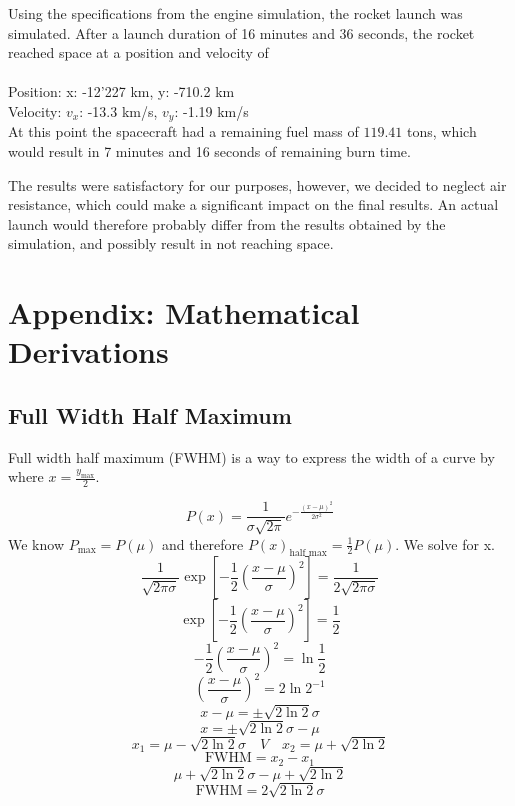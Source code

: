 \documentclass[reprint,english,notitlepage]{revtex4-2}
\begin{document}
Using the specifications from the engine simulation, the rocket launch was simulated.
After a launch duration of 16 minutes and 36 seconds, the rocket reached space at a position and velocity of\\\\
Position: x: -12'227 km, y: -710.2 km\\
Velocity: $v_x$: -13.3 km/s, $v_y$: -1.19 km/s\\

At this point the spacecraft had a remaining fuel mass of $119.41$ tons, which would result in 7 minutes and 16 seconds of remaining burn time.

The results were satisfactory for our purposes, however, we decided to neglect air resistance, which could make a significant impact on the final results.
An actual launch would therefore probably differ from the results obtained by the simulation, and possibly result in not reaching space.


\section{Appendix: Mathematical Derivations}
	\subsection{Full Width Half Maximum} \label{der: FWHM}
	Full width half maximum (FWHM) is a way to express the width of a curve by where $ x = \frac{y_{\text{max}}}{2} $.
		
	\[
	P(x) = \frac{1}{σ \sqrt{2π} }e ^{- \frac{\left( x - μ \right) ^{2}}{2σ^{2}}}
	\]
	We know $ P_{\text{max}} = P(μ) $ and therefore $ P(x)_{\text{half max}} = \frac{1}{2} P(μ) $. We solve for x.
	\[
	\frac{1}{\sqrt{2πσ}} \exp \left[ - \frac{1}{2} \left( \frac{x - μ}{σ} \right) ^{2} \right]  = \frac{1}{2\sqrt{2πσ}}
	\]
	\[
	\exp \left[ - \frac{1}{2} \left( \frac{x - μ}{σ} \right) ^{2} \right] = \frac{1}{2}
	\]
	\[
	- \frac{1}{2} \left( \frac{x - μ}{σ} \right) ^{2} = \ln \frac{1}{2}
	\]
	\[
		\left( \frac{x - μ}{σ} \right) ^{2} = 2\ln 2^{-1}
	\]
	\[
	x - μ = ± \sqrt{2\ln 2} σ 
	\]
	\[
	x = ± \sqrt{2\ln 2} σ - μ
	\]
	\[
	x_1 = μ - \sqrt{2\ln 2} σ \quad V \quad x_2 = μ + \sqrt{2\ln 2} 
	\]
	\[
	\text{FWHM} = x_2 - x_1
	\]
	\[
	μ + \sqrt{2\ln 2} σ - μ + \sqrt{2\ln 2}
	\]
	\[
	\text{FWHM} = 2\sqrt{2\ln 2} σ 
	\]
	
	
\end{document}
